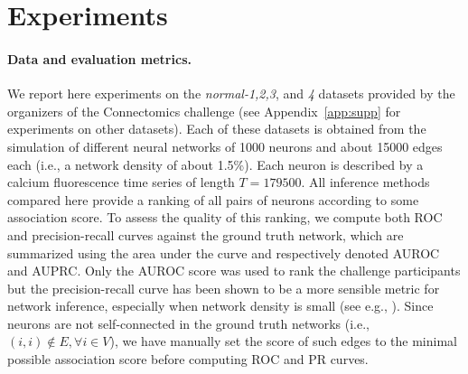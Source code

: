 \documentclass[wcp]{jmlr}
\begin{document}

\section{Experiments} \label{sec:results}


\paragraph{Data and evaluation metrics.}

We report here experiments on the \textit{normal-1,2,3}, and \textit{4}
datasets provided by the organizers of the Connectomics challenge (see
Appendix~\ref{app:supp} for experiments on other datasets). Each of
these datasets is obtained from the simulation \citep{stetter2012model} of
different neural networks of 1000 neurons and about 15000 edges each (i.e., a
network density of about 1.5\%). Each neuron is described by a calcium
fluorescence time series of length $T=179500$. All inference methods compared
here provide a ranking of all pairs of neurons according to some association score. To assess the quality of this ranking, we compute both ROC and
precision-recall curves against the ground truth network, which are summarized
using the area under the curve and respectively  denoted AUROC and AUPRC. Only
the AUROC score was used to rank the challenge participants but the precision-recall curve has been shown to be a more sensible metric for network
inference, especially when network density is small (see e.g.,
\cite{schrynemackers2013protocols}). Since neurons are not self-connected in
the ground truth networks (i.e., $(i, i) \not \in E, \forall i \in V$), we
have manually set the score of such edges to the minimal possible association
score before computing ROC and PR curves.
\end{document}
